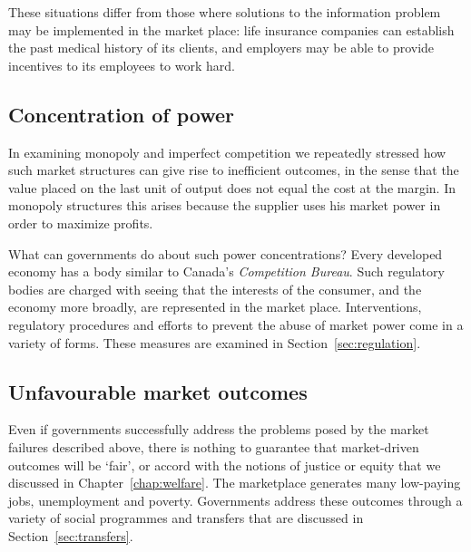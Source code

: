 These situations differ from those where solutions to the information problem may be implemented in the market place: life insurance companies can establish the past medical history of its clients, and employers may be able to provide incentives to its employees to work hard. 

\subsection*{Concentration of power}

In examining monopoly and imperfect competition we repeatedly stressed how such market structures can give rise to inefficient outcomes, in the sense that the value placed on the last unit of output does not equal the cost at the margin. In monopoly structures this arises because the supplier uses his market power in order to maximize profits. 

What can governments do about such power concentrations? Every developed economy has a body similar to Canada's \textit{Competition Bureau}. Such regulatory bodies are charged with seeing that the interests of the consumer, and the economy more broadly, are represented in the market place. Interventions, regulatory procedures and efforts to prevent the abuse of market power come in a variety of forms. These measures are examined in Section~\ref{sec:regulation}.

\subsection*{Unfavourable market outcomes}

Even if governments successfully address the problems posed by the market failures described above, there is nothing to guarantee that market-driven outcomes will be `fair', or accord with the notions of justice or equity that we discussed in Chapter~\ref{chap:welfare}. The marketplace generates many low-paying jobs, unemployment and poverty. Governments address these outcomes through a variety of social programmes and transfers that are discussed in Section~\ref{sec:transfers}.